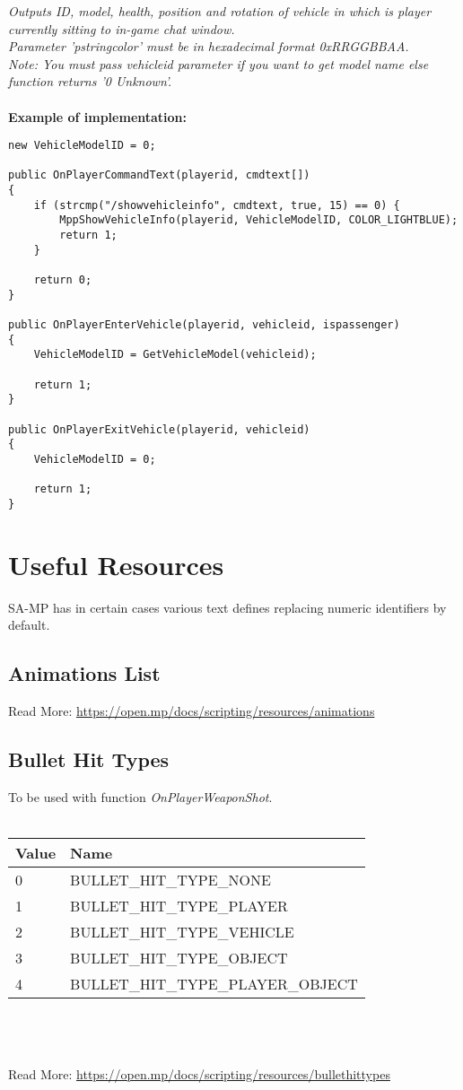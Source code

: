 \documentclass{article}
\begin{document}
\textit{Outputs ID, model, health, position and rotation of vehicle in which is player currently sitting to in-game chat window.
\\Parameter 'pstringcolor' must be in hexadecimal format 0xRRGGBBAA.
\\Note: You must pass vehicleid parameter if you want to get model name else function returns '0 Unknown'.}
\\
\\
\textbf{Example of implementation:}
\begin{verbatim}
new VehicleModelID = 0;

public OnPlayerCommandText(playerid, cmdtext[])
{
    if (strcmp("/showvehicleinfo", cmdtext, true, 15) == 0) {
        MppShowVehicleInfo(playerid, VehicleModelID, COLOR_LIGHTBLUE);
        return 1;
    }

    return 0;
}

public OnPlayerEnterVehicle(playerid, vehicleid, ispassenger)
{
    VehicleModelID = GetVehicleModel(vehicleid);

    return 1;
}

public OnPlayerExitVehicle(playerid, vehicleid)
{
    VehicleModelID = 0;

    return 1;
}
\end{verbatim}


\newpage
\section{Useful Resources}
SA-MP has in certain cases various text defines replacing numeric identifiers by default.


\subsection{Animations List}
Read More: \url{https://open.mp/docs/scripting/resources/animations}


\subsection{Bullet Hit Types}
To be used with function \textit{OnPlayerWeaponShot}.
\\
\\
\begin{tabular}{ |l|l| } 
\hline
Value & Name \\
\hline
0 & BULLET\_HIT\_TYPE\_NONE \\
1 & BULLET\_HIT\_TYPE\_PLAYER \\
2 & BULLET\_HIT\_TYPE\_VEHICLE \\
3 & BULLET\_HIT\_TYPE\_OBJECT \\
4 & BULLET\_HIT\_TYPE\_PLAYER\_OBJECT \\
\hline
\end{tabular}
\\\\
\\Read More: \url{https://open.mp/docs/scripting/resources/bullethittypes}
\end{document}
